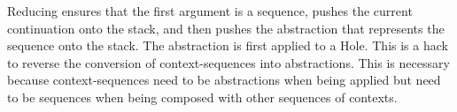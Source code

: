 Reducing  ensures that the first argument is a sequence, pushes the current continuation onto the stack, and then pushes the abstraction that represents the sequence onto the stack. The abstraction is first applied to a Hole. This is a hack to reverse the conversion of context-sequences into abstractions. This is necessary because context-sequences need to be abstractions when being applied but need to be sequences when being composed with other sequences of contexts.
\begin{comment}
eval (State (PushSubCont e e') d es q) = case e of
  Val v -> State e' Hole ([App (Val v) Hole]++(d:es)) q
  otherwise -> State e (ret d (PushSubCont Hole e')) es q
\end{comment}
\begin{Shaded}
\begin{Highlighting}[]
 \NormalTok{(} \FunctionTok{=}  
   \OtherTok{->}   \NormalTok{([} \NormalTok{(} \NormalTok{]}\FunctionTok{++}\FunctionTok{:}
  \OtherTok{->}    
\end{Highlighting}
\end{Shaded}

